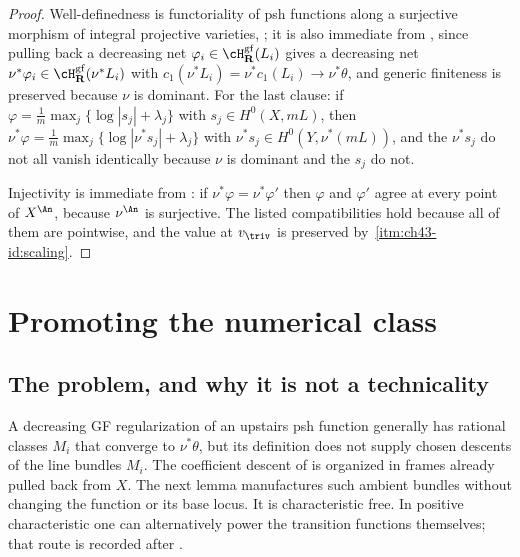 \begin{proof}
Well-definedness is functoriality of psh functions along a surjective
morphism of integral projective varieties,
\cite[Theorem~4.7]{BJ22}; it is also immediate from
, since pulling back a decreasing net
$\varphi_i\in\cH^{\mathrm{gf}}_{\mathbf R}(L_i)$ gives a decreasing net
$\nu^*\varphi_i\in\cH^{\mathrm{gf}}_{\mathbf R}(\nu^*L_i)$ with
$c_1(\nu^*L_i)=\nu^*c_1(L_i)\to\nu^*\theta$, and generic finiteness is
preserved because $\nu$ is dominant.  For the last clause: if
$\varphi=\frac1m\max_j\{\log|s_j|+\lambda_j\}$ with
$s_j\in H^0(X,mL)$, then
$\nu^*\varphi=\frac1m\max_j\{\log|\nu^*s_j|+\lambda_j\}$ with
$\nu^*s_j\in H^0(Y,\nu^*(mL))$, and the $\nu^*s_j$ do not all vanish
identically because $\nu$ is dominant and the $s_j$ do not.

Injectivity is immediate from
: if
$\nu^*\varphi=\nu^*\varphi'$ then $\varphi$ and $\varphi'$ agree at
every point of $X^{\An}$, because $\nu^{\An}$ is surjective.  The
listed compatibilities hold because all of them are pointwise, and the value
at $v_\triv$ is preserved by
\,\cref{itm:ch43-id:scaling}.
\end{proof}

\section{Promoting the numerical class}
\label{sec:ch43-promotion}

\subsection{The problem, and why it is not a technicality}
\label{sec:ch43-promotion-problem}

A decreasing GF regularization of an upstairs psh function generally has
rational classes $M_i$ that converge to $\nu^*\theta$, but its definition
does not supply chosen descents of the line bundles $M_i$.  The coefficient
descent of  is organized in frames already
pulled back from $X$.  The next lemma manufactures such ambient bundles
without changing the function or its base locus.  It is characteristic
free.  In positive characteristic one can alternatively power the
transition functions themselves; that route is recorded after
.

